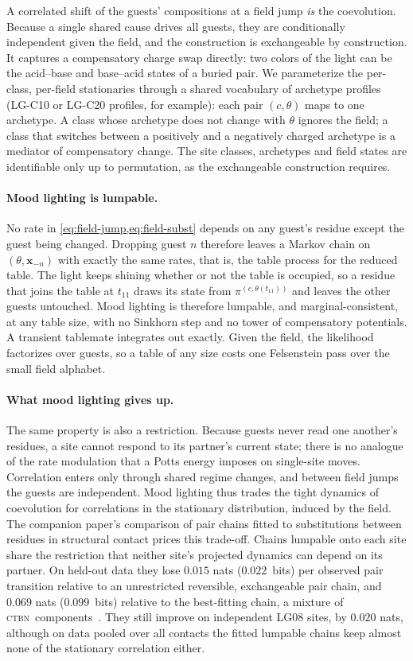 \documentclass[11pt]{article}
\newcommand{\CTBN}{\textsc{ctbn}}
\newcommand{\eqm}{\pi}
\begin{document}
A correlated shift of the guests' compositions at a field jump \emph{is} the
coevolution. Because a single shared cause drives all guests, they are
conditionally independent given the field, and the construction is
exchangeable by construction. It captures a compensatory charge swap
directly: two colors of the light can be the acid--base and base--acid states
of a buried pair. We parameterize the per-class, per-field stationaries
through a shared vocabulary of archetype profiles (LG-C10 or LG-C20
profiles, for example): each pair $(c,\theta)$ maps to one archetype. A class
whose archetype does not change with $\theta$ ignores the field; a class that
switches between a positively and a negatively charged archetype is a
mediator of compensatory change. The site classes, archetypes and field
states are identifiable only up to permutation, as the exchangeable
construction requires.

\paragraph{Mood lighting is lumpable.} No rate in
\cref{eq:field-jump,eq:field-subst} depends on any guest's residue except the
guest being changed. Dropping guest $n$ therefore leaves a Markov chain on
$(\theta,\bm x_{-n})$ with exactly the same rates, that is, the table
process for the reduced table. The light keeps shining whether or not the
table is occupied, so a residue that joins the table at $t_{11}$ draws its
state from $\eqm^{(c,\theta(t_{11}))}$ and leaves the other guests
untouched. Mood lighting is therefore lumpable, and marginal-consistent,
at any table size, with no Sinkhorn step and no tower of compensatory
potentials. A transient tablemate integrates out exactly. Given the field,
the likelihood factorizes over guests, so a table of any size costs one
Felsenstein pass over the small field alphabet.

\paragraph{What mood lighting gives up.} The same property is also a
restriction. Because guests never read one another's residues, a site cannot
respond to its partner's current state; there is no analogue of the rate
modulation that a Potts energy imposes on single-site moves. Correlation
enters only through shared regime changes, and between field jumps the guests
are independent. Mood lighting thus trades the tight dynamics of coevolution
for correlations in the stationary distribution, induced by the field. The
companion paper's comparison of pair chains fitted to substitutions between
residues in structural contact prices this trade-off. Chains lumpable onto
each site share the restriction that neither site's projected dynamics can
depend on its partner. On held-out data they lose $0.015$ nats
($0.022$~bits) per observed pair transition relative to an unrestricted
reversible, exchangeable pair chain, and $0.069$ nats ($0.099$~bits)
relative to the best-fitting chain, a mixture of \CTBN\
components~\citep{LargeHolmes2026Coupled}. They still improve on independent
LG08 sites, by $0.020$ nats, although on data pooled over all contacts the
fitted lumpable chains keep almost none of the stationary correlation either.
\end{document}
